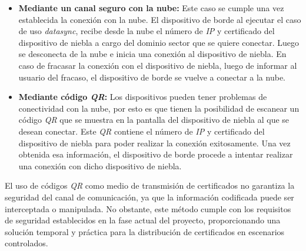 \begin{itemize}
    \item \textbf{Mediante un canal seguro con la nube:} Este caso se cumple una vez establecida la conexión con la nube. El dispositivo de borde al ejecutar el caso de uso \textit{datasync}, recibe desde la nube el número de \textit{IP} y certificado del dispositivo de niebla a cargo del dominio sector que se quiere conectar. Luego se desconecta de la nube e inicia una conexión al dispositivo de niebla. En caso de fracasar la conexión con el dispositivo de niebla, luego de informar al usuario del fracaso, el dispositivo de borde se vuelve a conectar a la nube.
    
    \item \textbf{Mediante código \textit{QR}:} Los dispositivos pueden tener problemas de conectividad con la nube, por esto es que tienen la posibilidad de escanear un código \textit{QR} que se muestra en la pantalla del dispositivo de niebla al que se desean conectar. Este \textit{QR} contiene el número de \textit{IP} y certificado del dispositivo de niebla para poder realizar la conexión exitosamente. Una vez obtenida esa información, el dispositivo de borde procede a intentar realizar una conexión con dicho dispositivo de niebla.
\end{itemize}

El uso de códigos \textit{QR} como medio de transmisión de certificados no garantiza la seguridad del canal de comunicación, ya que la información codificada puede ser interceptada o manipulada. No obstante, este método cumple con los requisitos de seguridad establecidos en la fase actual del proyecto, proporcionando una solución temporal y práctica para la distribución de certificados en escenarios controlados.

